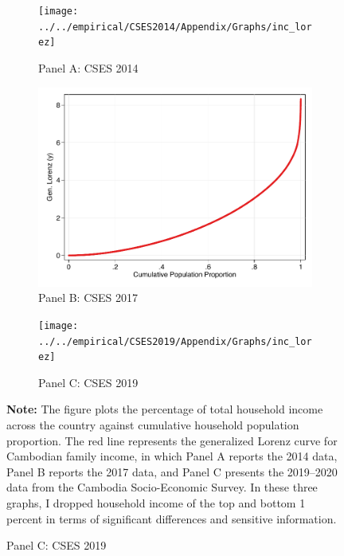 \documentclass[11pt,letterpaper]{article}
\begin{document}
\begin{figure}[H]
	\caption{Generalized Lorenz curves for household incomes between 2014--2020}
	\label{fig:5}
	\begin{subfigure}[b]{0.33\linewidth}
		\caption*{Panel A: CSES 2014} \vspace{-.5em}
		\label{fig:5a}
		\texttt{[image: ../../empirical/CSES2014/Appendix/Graphs/inc\_lorez]} 
	\end{subfigure}%
	\hfil
	\begin{subfigure}[b]{0.33\linewidth}
		\caption*{Panel B: CSES 2017} \vspace{-.5em}
		\label{fig:5b}
		\includegraphics[width=1\linewidth]{../../empirical/CSES2017/Appendix/Graphs/inc_lorez} 
	\end{subfigure}
	\hfil
	\begin{subfigure}[b]{0.33\linewidth}
		\caption*{Panel C: CSES 2019} \vspace{-.5em}
		\label{fig:5c}
		\texttt{[image: ../../empirical/CSES2019/Appendix/Graphs/inc\_lorez]} 
	\end{subfigure}
	
	\footnotesize
	\item \textbf{Note:} The figure plots the percentage of total household income across the country against cumulative household population proportion. The red line represents the generalized Lorenz curve for Cambodian family income, in which Panel A reports the 2014 data, Panel B reports the 2017 data, and Panel C presents the 2019--2020 data from the Cambodia Socio-Economic Survey. In these three graphs, I dropped household income of the top and bottom 1 percent in terms of significant differences and sensitive information.   
\end{figure}
\end{document}
